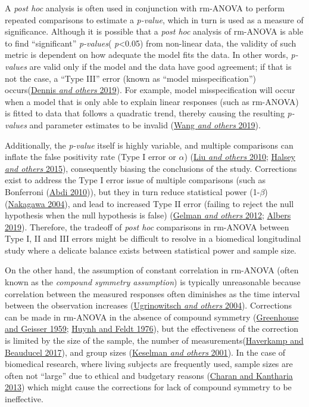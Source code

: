 \documentclass[
]{article}
\begin{document}
A \emph{post hoc} analysis is often used in conjunction with rm-ANOVA to perform repeated comparisons to estimate a \emph{p-value}, which in turn is used as a measure of significance.
Although it is possible that a \emph{post hoc} analysis of rm-ANOVA is able to find ``significant'' \emph{p-values}( \emph{p}\textless0.05) from non-linear data, the validity of such metric is dependent on how adequate the model fits the data. In other words, \emph{p-values} are valid only if the model and the data have good agreement; if that is not the case, a ``Type III'' error (known as ``model misspecification'') occurs(\protect\hyperlink{ref-dennis2019}{Dennis \emph{and others} 2019}). For example, model misspecification will occur when a model that is only able to explain linear responses (such as rm-ANOVA) is fitted to data that follows a quadratic trend, thereby causing the resulting \emph{p-values} and parameter estimates to be invalid (\protect\hyperlink{ref-wang2019}{Wang \emph{and others} 2019}).

Additionally, the \emph{p-value} itself is highly variable, and multiple comparisons can inflate the false positivity rate (Type I error or \(\alpha\)) (\protect\hyperlink{ref-liu2010}{Liu \emph{and others} 2010}; \protect\hyperlink{ref-halsey2015}{Halsey \emph{and others} 2015}), consequently biasing the conclusions of the study. Corrections exist to address the Type I error issue of multiple comparisons (such as Bonferroni (\protect\hyperlink{ref-abdi2010}{Abdi 2010})), but they in turn reduce statistical power (1-\(\beta\))(\protect\hyperlink{ref-nakagawa2004}{Nakagawa 2004}), and lead to increased Type II error (failing to reject the null hypothesis when the null hypothesis is false) (\protect\hyperlink{ref-gelman2012}{Gelman \emph{and others} 2012}; \protect\hyperlink{ref-albers2019}{Albers 2019}). Therefore, the tradeoff of \emph{post hoc} comparisons in rm-ANOVA between Type I, II and III errors might be difficult to resolve in a biomedical longitudinal study where a delicate balance exists between statistical power and sample size.

On the other hand, the assumption of constant correlation in rm-ANOVA (often known as the \emph{compound symmetry assumption}) is typically unreasonable because correlation between the measured responses often diminishes as the time interval between the observation increases (\protect\hyperlink{ref-ugrinowitsch2004}{Ugrinowitsch \emph{and others} 2004}). Corrections can be made in rm-ANOVA in the absence of compound symmetry (\protect\hyperlink{ref-greenhouse1959}{Greenhouse and Geisser 1959}; \protect\hyperlink{ref-huynh1976}{Huynh and Feldt 1976}), but the effectiveness of the correction is limited by the size of the sample, the number of measurements(\protect\hyperlink{ref-haverkamp2017}{Haverkamp and Beauducel 2017}), and group sizes (\protect\hyperlink{ref-keselman2001}{Keselman \emph{and others} 2001}). In the case of biomedical research, where living subjects are frequently used, sample sizes are often not ``large'' due to ethical and budgetary reasons (\protect\hyperlink{ref-charan2013}{Charan and Kantharia 2013}) which might cause the corrections for lack of compound symmetry to be ineffective.
\end{document}
